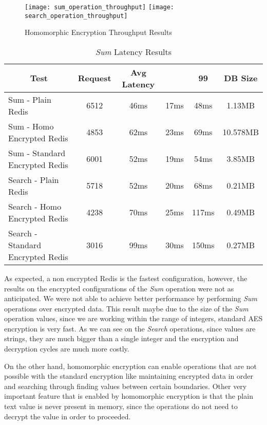 \begin{figure}[htbp]
  \centering
    {\texttt{[image: sum\_operation\_throughput]}}%
    {\texttt{[image: search\_operation\_throughput]}}%
  \caption{Homomorphic Encryption Throughput Results}
  \label{fig:homomorphic_encryption_throughput_results}
\end{figure}

\begin{table}[ht]
	\caption{\textit{Sum} Latency Results}
	\label{tab:sum_latency_results}
\centering
\begin{tabular}{lccccc}
	\toprule
	\multicolumn{1}{c}{\textbf{Test}} & \pmb{\#}\textbf{Request} & \textbf{Avg Latency} & \pmb{\ensuremath{\sigma}} & \textbf{99}\pmb{\%} & \textbf{DB Size} \\
	\midrule
		Sum - Plain Redis & 6512 & 46ms & 17ms & 48ms & 1.13MB  					\\
		Sum - Homo Encrypted Redis & 4853 & 62ms & 23ms & 69ms & 10.578MB  		\\
		Sum - Standard Encrypted Redis & 6001 & 52ms & 19ms & 54ms & 3.85MB  	\\
		Search - Plain Redis & 5718 & 52ms & 20ms & 68ms & 0.21MB				\\
		Search - Homo Encrypted Redis & 4238	 & 70ms & 25ms & 117ms & 0.49MB		\\
		Search - Standard Encrypted Redis & 3016	 & 99ms & 30ms & 150ms & 0.27MB	\\
	\bottomrule
\end{tabular}
\end{table}

As expected, a non encrypted Redis is the fastest configuration, however, the results on the encrypted configurations of the \textit{Sum} operation were not as anticipated. We were not able to achieve better performance by performing \textit{Sum} operations over encrypted data. This result maybe due to the size of the \textit{Sum} operation values, since we are working within the range of integers, standard \gls{AES} encryption is very fast. As we can see on the \textit{Search} operations, since values are strings, they are much bigger than a single integer and the encryption and decryption cycles are much more costly.

On the other hand, homomorphic encryption can enable operations that are not possible with the standard encryption like maintaining encrypted data in order and searching through finding values between certain boundaries. Other very important feature that is enabled by homomorphic encryption is that the plain text value is never present in memory, since the operations do not need to decrypt the value in order to proceeded.

